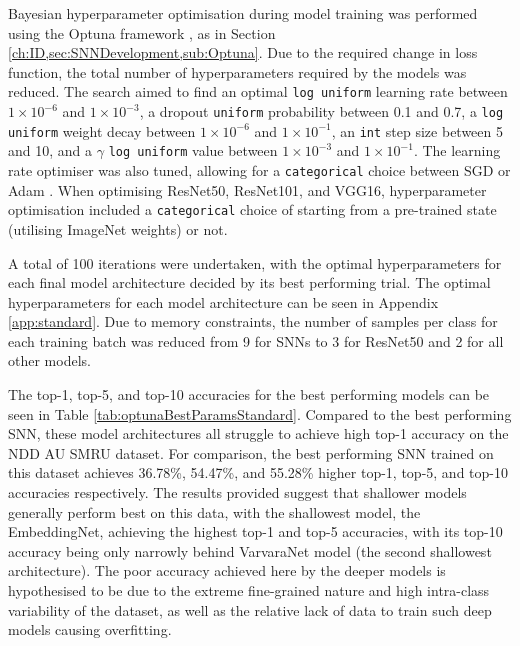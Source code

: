 Bayesian hyperparameter optimisation during model training was performed using the Optuna framework \cite{akiba_optuna_2019}, as in Section \ref{ch:ID,sec:SNNDevelopment,sub:Optuna}. Due to the required change in loss function, the total number of hyperparameters required by the models was reduced. The search aimed to find an optimal \texttt{log uniform} learning rate between $1\times10^{-6}$ and $1\times10^{-3}$, a dropout \cite{srivastava_dropout:_2014} \texttt{uniform} probability between 0.1 and 0.7, a \texttt{log uniform} weight decay between $1\times10^{-6}$ and $1\times10^{-1}$, an \texttt{int} step size between 5 and 10, and a $\gamma$ \texttt{log uniform} value between $1\times10^{-3}$ and $1\times10^{-1}$. The learning rate optimiser was also tuned, allowing for a \texttt{categorical} choice between SGD or Adam \cite{kingma_adam:_2014}. When optimising ResNet50, ResNet101, and VGG16, hyperparameter optimisation included a \texttt{categorical} choice of starting from a pre-trained state (utilising ImageNet \cite{krizhevsky_learning_2009} weights) or not.

A total of 100 iterations were undertaken, with the optimal hyperparameters for each final model architecture decided by its best performing trial. The optimal hyperparameters for each model architecture can be seen in Appendix \ref{app:standard}. Due to memory constraints, the number of samples per class for each training batch was reduced from 9 for SNNs to 3 for ResNet50 and 2 for all other models.

The top-1, top-5, and top-10 accuracies for the best performing models can be seen in Table \ref{tab:optunaBestParamsStandard}. Compared to the best performing SNN, these model architectures all struggle to achieve high top-1 accuracy on the NDD AU SMRU dataset. For comparison, the best performing SNN trained on this dataset achieves 36.78\%, 54.47\%, and 55.28\% higher top-1, top-5, and top-10 accuracies respectively. The results provided suggest that shallower models generally perform best on this data, with the shallowest model, the EmbeddingNet, achieving the highest top-1 and top-5 accuracies, with its top-10 accuracy being only narrowly behind VarvaraNet model (the second shallowest architecture). The poor accuracy achieved here by the deeper models is hypothesised to be due to the extreme fine-grained nature and high intra-class variability of the dataset, as well as the relative lack of data to train such deep models causing overfitting. 

